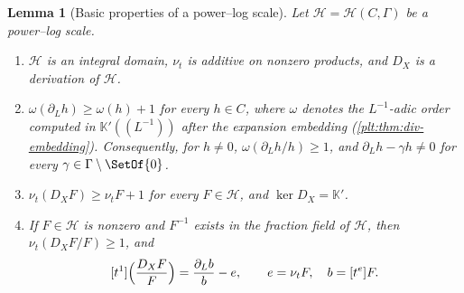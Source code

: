 \documentclass[11pt,oneside]{article}
\theoremstyle{plain}
\newtheorem{lemma}[theorem]{Lemma}
\theoremstyle{definition}
\theoremstyle{remark}
\newcommand{\K}{\mathbb{K}}
\newcommand{\ordt}{\nu_{t}}                              %
\newcommand{\DX}{D_{X}}                                  %
\begin{document}
\begin{lemma}[Basic properties of a power--log scale]
\label{plt:lem:dif-scale-basic}
Let \(\mathcal H=\mathcal H(C,\Gamma)\) be a power--log scale.
\begin{enumerate}
\item \(\mathcal H\) is an integral domain, \(\ordt\) is additive on nonzero
      products, and \(\DX\) is a derivation of \(\mathcal H\).
\item \(\omega(\partial_{L}h)\ge\omega(h)+1\) for every \(h\in C\), where
      \(\omega\) denotes the \(L^{-1}\)-adic order computed in
      \(\K'((L^{-1}))\) after the expansion embedding
      (\cref{plt:thm:div-embedding}).  Consequently, for \(h\ne0\),
      \(\omega(\partial_{L}h/h)\ge1\), and \(\partial_{L}h-\gamma h\ne0\) for
      every \(\gamma\in\Gamma\setminus\SetOf{0}\).
\item \(\ordt(\DX F)\ge\ordt F+1\) for every \(F\in\mathcal H\), and
      \(\ker\DX=\K'\).
\item If \(F\in\mathcal H\) is nonzero and \(F^{-1}\) exists in the fraction
      field of \(\mathcal H\), then \(\ordt(\DX F/F)\ge1\), and
\begin{equation}\label{plt:eq:dif-logderiv-block}
  [t^{1}]\Bigl(\frac{\DX F}{F}\Bigr)
  =\frac{\partial_{L}b}{b}-e,
  \qquad e=\ordt F,\quad b=[t^{e}]F .
\end{equation}
\end{enumerate}
\end{lemma}
\end{document}
